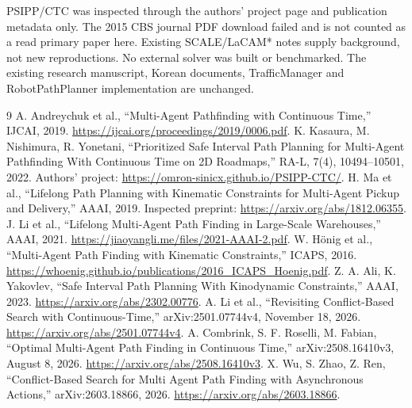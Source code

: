 \documentclass[11pt,a4paper]{article}
\begin{document}
PSIPP/CTC was inspected through the authors' project page and publication
metadata only. The 2015 CBS journal PDF download failed and is not counted as
a read primary paper here. Existing SCALE/LaCAM* notes supply background, not
new reproductions. No external solver was built or benchmarked. The existing
research manuscript, Korean documents, TrafficManager and RobotPathPlanner
implementation are unchanged.

\begin{thebibliography}{9}\small
{} A. Andreychuk et al., ``Multi-Agent Pathfinding with Continuous
Time,'' IJCAI, 2019. \url{https://ijcai.org/proceedings/2019/0006.pdf}.
 K. Kasaura, M. Nishimura, R. Yonetani, ``Prioritized Safe
Interval Path Planning for Multi-Agent Pathfinding With Continuous Time on 2D
Roadmaps,'' RA-L, 7(4), 10494--10501, 2022. Authors' project:
\url{https://omron-sinicx.github.io/PSIPP-CTC/}.
 H. Ma et al., ``Lifelong Path Planning with Kinematic Constraints
for Multi-Agent Pickup and Delivery,'' AAAI, 2019. Inspected preprint:
\url{https://arxiv.org/abs/1812.06355}.
 J. Li et al., ``Lifelong Multi-Agent Path Finding in Large-Scale
Warehouses,'' AAAI, 2021. \url{https://jiaoyangli.me/files/2021-AAAI-2.pdf}.
 W. H\"onig et al., ``Multi-Agent Path Finding with Kinematic
Constraints,'' ICAPS, 2016. \url{https://whoenig.github.io/publications/2016_ICAPS_Hoenig.pdf}.
 Z. A. Ali, K. Yakovlev, ``Safe Interval Path Planning With
Kinodynamic Constraints,'' AAAI, 2023. \url{https://arxiv.org/abs/2302.00776}.
 A. Li et al., ``Revisiting Conflict-Based Search with
Continuous-Time,'' arXiv:2501.07744v4, November 18, 2026.
\url{https://arxiv.org/abs/2501.07744v4}.
 A. Combrink, S. F. Roselli, M. Fabian, ``Optimal Multi-Agent Path
Finding in Continuous Time,'' arXiv:2508.16410v3, August 8, 2026.
\url{https://arxiv.org/abs/2508.16410v3}.
 X. Wu, S. Zhao, Z. Ren, ``Conflict-Based Search for Multi Agent
Path Finding with Asynchronous Actions,'' arXiv:2603.18866, 2026.
\url{https://arxiv.org/abs/2603.18866}.
\end{thebibliography}
\end{document}
